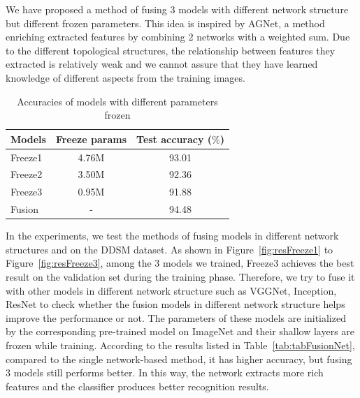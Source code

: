\documentclass[12pt]{article}
\begin{document}
We have proposed a method of fusing 3 models 
with different network structure but different 
frozen parameters. This idea is inspired by AGNet, 
a method enriching extracted features by combining 
2 networks with a weighted sum. Due to the 
different topological structures, the relationship
between features they extracted is relatively weak 
and we cannot assure that they have learned 
knowledge of different aspects from the training 
images.

\begin{table}[ht]
  \renewcommand{\arraystretch}{1.3}
  \caption{Accuracies of models with different 
  parameters frozen}
  \label{tab:tabFusionPara}
  \begin{center}
  \begin{tabular}{|l|c|c|}
    \hline
        
        Models & Freeze params & Test accuracy ($\%$) \\
        
        \hline
        
        Freeze1 & 4.76M & 93.01 \\
        Freeze2 & 3.50M & 92.36 \\
        Freeze3 & 0.95M & 91.88 \\
        Fusion  &  -    & 94.48 \\
        
        \hline
  \end{tabular}
  \end{center}
  \end{table}

In the experiments, we test the methods of 
fusing models in different network structures 
and on the DDSM dataset. As shown in 
Figure~\ref{fig:resFreeze1} to 
Figure~\ref{fig:resFreeze3}, 
among the 3 models we trained, Freeze3 
achieves the best result on the validation set 
during the training phase. Therefore, we try 
to fuse it with other models in different 
network structure such as VGGNet, Inception,
ResNet to check whether the fusion models 
in different network structure helps improve 
the performance or not. The parameters of 
these models are initialized by the 
corresponding pre-trained model on ImageNet 
and their shallow layers are frozen while 
training. According to the results listed in
Table~\ref{tab:tabFusionNet}, 
compared to the single network-based method, 
it has higher accuracy, but fusing 3 models 
still performs better. In this way, the 
network extracts more rich features and the 
classifier produces better recognition 
results.
\end{document}
